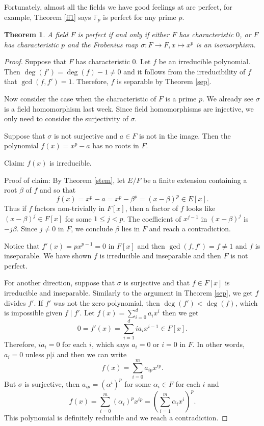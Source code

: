 \documentclass[12pt]{report}
\newtheorem{thm}{Theorem}[section]
\theoremstyle{definition}
\def\FF{\mathbb{F}}
\def\aa{\alpha}
\def\bb{\beta}
\begin{document}
Fortunately, almost all the fields we have good feelings at are perfect, for example, Theorem \ref{ff1} says $\FF_p$ is perfect for any prime $p$.

\begin{thm}
    A field $F$ is perfect if and only if either $F$ has characteristic $0$, or $F$ has characteristic $p$ and the Frobenius map $\sigma: F\to F, x\mapsto x^p$ is an isomorphism.
\end{thm}

\begin{proof}
    Suppose that $F$ has characteristic 0. Let $f$ be an irreducible polynomial. Then $\deg(f')=\deg(f)-1\not=0$ and it follows from the irreducibility of $f$ that $\gcd(f,f')=1$. Therefore, $f$ is separable by Theorem \ref{sep}.  

    Now consider the case when the characteristic of $F$ is a prime $p$. We already see $\sigma$ is a field homomorphism last week. Since field homomorphisms are injective, we only need to consider the surjectivity  of $\sigma$.

    Suppose that $\sigma$ is not surjective and $a\in F$ is not in the image. Then the polynomial $f(x)=x^p-a$ has no roots in $F$. 
    
    Claim: $f(x)$ is irreducible.

    Proof of claim: By Theorem \ref{stem}, let $E/F$ be a finite extension containing a root $\bb$ of $f$ and so that $$f(x)=x^p-a=x^p-\bb^p=(x-\bb)^p \in E[x].$$
    Thus if $f$ factors non-trivially in $F[x]$, then a factor of $f$ looks like $(x-\bb)^j \in F[x]$ for some $1\leq j<p$. The coefficient of $x^{j-1}$ in $(x-\bb)^j$ is $-j\bb$. Since $j\not=0$ in $F$, we conclude $\bb$ lies in $F$ and reach a contradiction. 

    Notice that $f'(x)=px^{p-1} = 0$ in $F[x]$ and then $\gcd(f,f')=f\not=1$ and $f$ is inseparable. We have shown $f$ is irreducible and inseparable and then $F$ is not perfect.
    
    For another direction, suppose that $\sigma$ is surjective and that $f\in F[x]$ is irreducible and inseparable. Similarly to the argument in Theorem \ref{sep}, we get $f$ divides $f'$. If $f'$ was not the zero polynomial, then $\deg(f')< \deg(f)$, which is impossible given $f\mid f'$. Let $f(x)=\sum_{i=0}^d a_ix^i$ then we get $$0=f'(x)=\sum_{i=1}^dia_ix^{i-1}\in F[x].$$  Therefore, $ia_i=0$ for each $i$, which says $a_i=0$ or $i=0$ in $F$. In other words, $a_i=0$ unless $p|i$ and then we can write $$f(x)= \sum_{i=0}^m a_{ip}x^{ip}.$$ But $\sigma$ is surjective, then $a_{ip} =  (\aa^i)^p$ for some $\aa_i\in F$ for each $i$ and $$f(x) =  \sum_{i=0}^m (\aa_i)^p x^{ip} = (\sum_{i=1}^m \aa_ix^i)^p.$$ This polynomial is definitely reducible and we reach a contradiction.
\end{proof}
\end{document}
